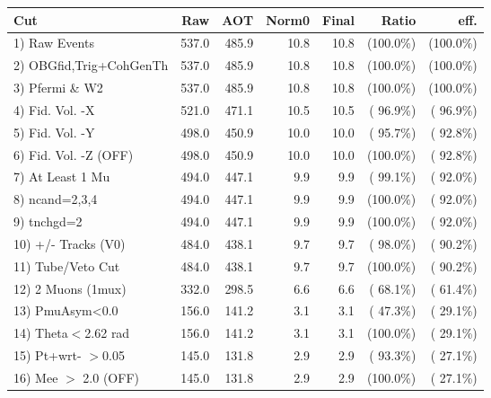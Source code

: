 \begin{table}[h!]\centering
 \begin{tabular}{||l||r|r|r|r|r|r||}
 \hline
 \hline
 Cut & Raw & AOT & Norm0 & Final & Ratio & eff.       \\
 \hline
  1) Raw Events           &        537.0 &        485.9 &         10.8 &         10.8 & (100.0\%) & (100.0\%) \\
  2) OBGfid,Trig+CohGenTh &        537.0 &        485.9 &         10.8 &         10.8 & (100.0\%) & (100.0\%) \\
  3) Pfermi \& W2         &        537.0 &        485.9 &         10.8 &         10.8 & (100.0\%) & (100.0\%) \\
  4) Fid. Vol. -X         &        521.0 &        471.1 &         10.5 &         10.5 & ( 96.9\%) & ( 96.9\%) \\
  5) Fid. Vol. -Y         &        498.0 &        450.9 &         10.0 &         10.0 & ( 95.7\%) & ( 92.8\%) \\
  6) Fid. Vol. -Z (OFF)   &        498.0 &        450.9 &         10.0 &         10.0 & (100.0\%) & ( 92.8\%) \\
  7) At Least 1 Mu        &        494.0 &        447.1 &          9.9 &          9.9 & ( 99.1\%) & ( 92.0\%) \\
  8) ncand=2,3,4          &        494.0 &        447.1 &          9.9 &          9.9 & (100.0\%) & ( 92.0\%) \\
  9) tnchgd=2             &        494.0 &        447.1 &          9.9 &          9.9 & (100.0\%) & ( 92.0\%) \\
 10) +/- Tracks (V0)      &        484.0 &        438.1 &          9.7 &          9.7 & ( 98.0\%) & ( 90.2\%) \\
 11) Tube/Veto Cut        &        484.0 &        438.1 &          9.7 &          9.7 & (100.0\%) & ( 90.2\%) \\
 12) 2 Muons (1mux)       &        332.0 &        298.5 &          6.6 &          6.6 & ( 68.1\%) & ( 61.4\%) \\
 13) PmuAsym<0.0          &        156.0 &        141.2 &          3.1 &          3.1 & ( 47.3\%) & ( 29.1\%) \\
 14) Theta$<$2.62 rad     &        156.0 &        141.2 &          3.1 &          3.1 & (100.0\%) & ( 29.1\%) \\
 15) Pt+wrt- $>$0.05      &        145.0 &        131.8 &          2.9 &          2.9 & ( 93.3\%) & ( 27.1\%) \\
 16) Mee $>$ 2.0  (OFF)   &        145.0 &        131.8 &          2.9 &          2.9 & (100.0\%) & ( 27.1\%) \\

\end{tabular}
\end{table}
